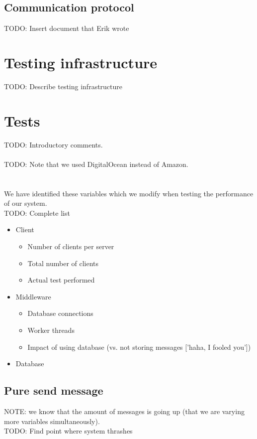 \documentclass{article}
\begin{document}
        \subsection{Communication protocol}
            TODO: Insert document that Erik wrote

    \section{Testing infrastructure}
        TODO: Describe testing infrastructure
        
    \section{Tests}
        TODO: Introductory comments.\\
        \\
        TODO: Note that we used DigitalOcean instead of Amazon.\\
        \\
        \\
        We have identified these variables which we modify when testing the performance of our system.\\
        TODO: Complete list
        \begin{itemize}
            \item Client
            \begin{itemize}
                \item Number of clients per server
                \item Total number of clients
                \item Actual test performed
            \end{itemize}
            \item Middleware
            \begin{itemize}
                \item Database connections
                \item Worker threads
                \item Impact of using database (vs. not storing messages ['haha, I fooled you'])
            \end{itemize}
            \item Database
        \end{itemize}

        \subsection{Pure send message}
            NOTE: we know that the amount of messages is going up (that we are varying more variables simultaneously).\\
            TODO: Find point where system thrashes
\end{document}
